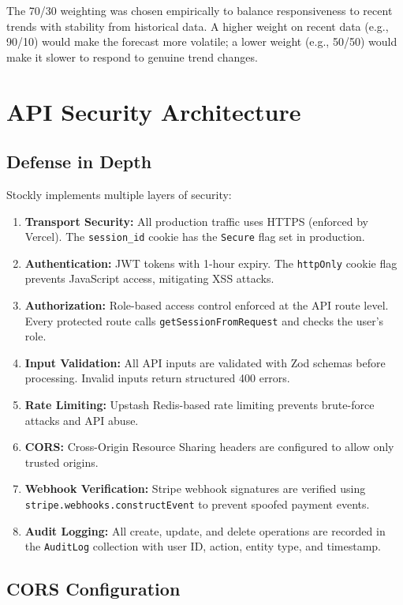 \documentclass[12pt,a4paper]{report}
\begin{document}
The 70/30 weighting was chosen empirically to balance responsiveness to recent trends with stability from historical data. A higher weight on recent data (e.g., 90/10) would make the forecast more volatile; a lower weight (e.g., 50/50) would make it slower to respond to genuine trend changes.

\section{API Security Architecture}

\subsection{Defense in Depth}

Stockly implements multiple layers of security:

\begin{enumerate}[leftmargin=1.5em]
  \item \textbf{Transport Security:} All production traffic uses HTTPS (enforced by Vercel). The \texttt{session\_id} cookie has the \texttt{Secure} flag set in production.
  \item \textbf{Authentication:} JWT tokens with 1-hour expiry. The \texttt{httpOnly} cookie flag prevents JavaScript access, mitigating XSS attacks.
  \item \textbf{Authorization:} Role-based access control enforced at the API route level. Every protected route calls \texttt{getSessionFromRequest} and checks the user's role.
  \item \textbf{Input Validation:} All API inputs are validated with Zod schemas before processing. Invalid inputs return structured 400 errors.
  \item \textbf{Rate Limiting:} Upstash Redis-based rate limiting prevents brute-force attacks and API abuse.
  \item \textbf{CORS:} Cross-Origin Resource Sharing headers are configured to allow only trusted origins.
  \item \textbf{Webhook Verification:} Stripe webhook signatures are verified using \texttt{stripe.webhooks.constructEvent} to prevent spoofed payment events.
  \item \textbf{Audit Logging:} All create, update, and delete operations are recorded in the \texttt{AuditLog} collection with user ID, action, entity type, and timestamp.
\end{enumerate}

\subsection{CORS Configuration}
\end{document}
